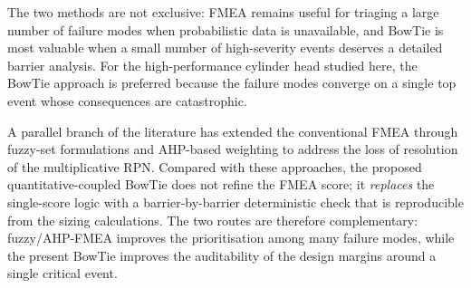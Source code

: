 \begin{table}[!htbp]
\caption{Illustrative AIAG--VDA 2019 scoring of the six threats $T_{1}$--$T_{6}$ of the BowTie diagram. Severity, occurrence, and detectability follow the harmonised severity-occurrence-detection rubric of \citet{aiagvda2019fmea}; each score is the median of three independent assignments by the present authors and \emph{not} the output of a formal expert panel. Occurrence is calibrated to the ASTM~A877/A877M tolerance band rather than to subjective frequency judgement. The scores are intended to support a structural comparison between BowTie and RPN, not to constitute a stand-alone risk ranking.}\label{tbl:rpn-comparison}
\centering
{}
\end{table}

The two methods are not exclusive: FMEA remains useful for triaging a
large number of failure modes when probabilistic data is unavailable,
and BowTie is most valuable when a small number of high-severity events
deserves a detailed barrier analysis. For the high-performance cylinder
head studied here, the BowTie approach is preferred because the failure
modes converge on a single top event whose consequences are catastrophic.

A parallel branch of the literature has extended the conventional FMEA
through fuzzy-set formulations and AHP-based weighting to address the
loss of resolution of the multiplicative RPN. Compared with these
approaches, the proposed quantitative-coupled BowTie does not refine
the FMEA score; it \emph{replaces} the single-score logic with a
barrier-by-barrier deterministic check that is reproducible from the
sizing calculations. The two routes are therefore complementary:
fuzzy/AHP-FMEA improves the prioritisation among many failure modes,
while the present BowTie improves the auditability of the design
margins around a single critical event.

